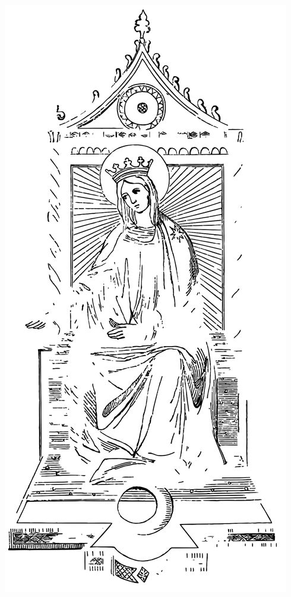 \pagestyle{empty}
\hspace{0pt}
\vfill
\begin{center}
  \begin{minipage}{0.7\textwidth}
    \begin{center}
      {\headerfont\Huge \thetitle} \\
      \vspace{0.1\pageheight}
      {\headerfont\Large \theauthor}
    \end{center}
  \end{minipage}
  \\
  \vspace{0.1\pageheight}
  \includegraphics[height=0.4\pageheight]{th.jpg}
\end{center}
\vfill
\hspace{0pt}
\newpage
